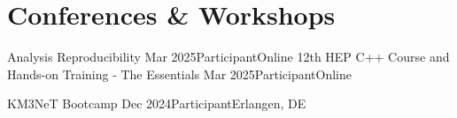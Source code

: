 \documentclass[letterpaper,11pt]{article}
\begin{document}
{%
      
      
      



\section{Conferences \& Workshops}
\resumeSubHeadingListStart
      \resumeSubheading
      {Analysis Reproducibility}
      {Mar 2025}{Participant}{Online}
      \resumeSubheading
      {12th HEP C++ Course and Hands-on Training - The Essentials}
      {Mar 2025}{Participant}{Online}
      
      \resumeSubheading
      {KM3NeT Bootcamp}
      {Dec 2024}{Participant}{Erlangen, DE}
      
}
\end{document}
